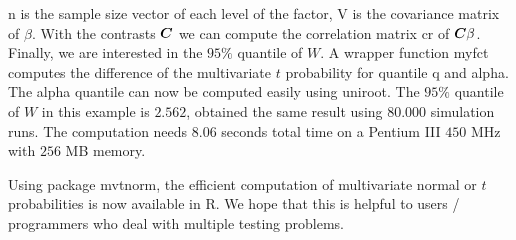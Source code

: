 \documentclass[11pt]{amsart}
\newcommand{\C}{\mbox{\boldmath $C$}}
\begin{document}
{\ttfamily n} is the sample size vector of each level of the
factor, {\ttfamily V} is the covariance matrix of $ \beta $. With
the contrasts $ \C $ we can compute the correlation matrix
{\ttfamily cr} of $ \C\beta $. Finally, we are interested in the
$ 95\%$ quantile of $ W $. A wrapper function {\ttfamily myfct}
computes the difference of the multivariate $ t $ probability for
quantile {\ttfamily q} and {\ttfamily alpha}. The {\ttfamily
alpha} quantile can now be computed easily using {\ttfamily
uniroot}. The $95\%$ quantile of $ W $ in this example is $ 2.562
$, \cite{the-effici:1987} obtained the same result using $ 80.000
$ simulation runs. The computation needs $ 8.06 $ seconds total
time on a Pentium III $450$ MHz with $256$ MB memory.

Using package {\ttfamily mvtnorm}, the efficient computation of
multivariate normal or $ t $ probabilities is now available
in {\ttfamily R}. We hope that this is helpful to users / programmers who
deal with multiple testing problems.



\end{document}
